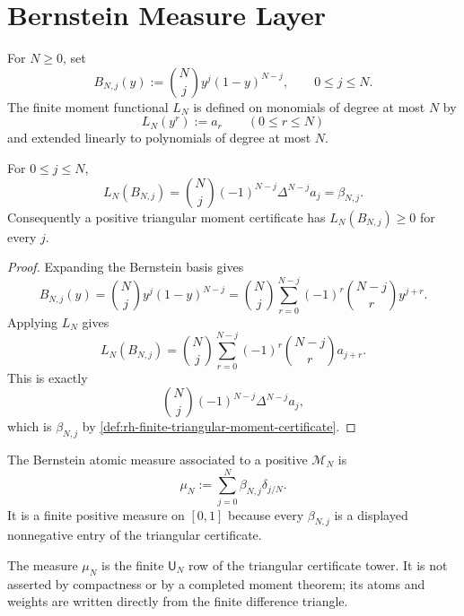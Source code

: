 \section{Bernstein Measure Layer}
\label{sec:rh-xi-bernstein-measure-layer}

\begin{definition}
\label{def:rh-bernstein-basis-moment-functional}
For $N\ge0$, set
$$
B_{N,j}(y)
:=
\binom{N}{j}y^j(1-y)^{N-j},
\qquad
0\le j\le N.
$$
The finite moment functional $L_N$ is defined on monomials of degree at
most $N$ by
$$
L_N(y^r):=a_r
\qquad
(0\le r\le N)
$$
and extended linearly to polynomials of degree at most $N$.
\end{definition}

\begin{theorem}
\label{thm:rh-bernstein-weights-finite-differences}
For $0\le j\le N$,
$$
L_N(B_{N,j})
=
\binom{N}{j}
(-1)^{N-j}\Delta^{N-j}a_j
=
\beta_{N,j}.
$$
Consequently a positive triangular moment certificate has
$L_N(B_{N,j})\ge0$ for every $j$.
\end{theorem}

\begin{proof}
Expanding the Bernstein basis gives
$$
B_{N,j}(y)
=
\binom{N}{j}y^j(1-y)^{N-j}
=
\binom{N}{j}
\sum_{r=0}^{N-j}
(-1)^r
\binom{N-j}{r}
y^{j+r}.
$$
Applying $L_N$ gives
$$
L_N(B_{N,j})
=
\binom{N}{j}
\sum_{r=0}^{N-j}
(-1)^r
\binom{N-j}{r}
a_{j+r}.
$$
This is exactly
$$
\binom{N}{j}(-1)^{N-j}\Delta^{N-j}a_j,
$$
which is $\beta_{N,j}$ by
\autoref{def:rh-finite-triangular-moment-certificate}.
\end{proof}

\begin{definition}
\label{def:rh-bernstein-atomic-measure}
The Bernstein atomic measure associated to a positive
$\mathcal M_N$ is
$$
\mu_N
:=
\sum_{j=0}^{N}
\beta_{N,j}\delta_{j/N}.
$$
It is a finite positive measure on $[0,1]$ because every
$\beta_{N,j}$ is a displayed nonnegative entry of the triangular
certificate.
\end{definition}

\begin{principle}
\label{prin:rh-bernstein-layer-unit-positive-row}
The measure $\mu_N$ is the finite $\mathsf U_N$ row of the triangular
certificate tower. It is not asserted by compactness or by a completed
moment theorem; its atoms and weights are written directly from the
finite difference triangle.
\end{principle}

